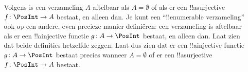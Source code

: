 \documentclass[openany]{memoir}
\begin{document}
\begin{prob}
  Volgens  is een verzameling $A$
  aftelbaar als $A = \emptyset$ of als er een !!a{surjective}
  $f\colon \PosInt \to A$ bestaat, en alleen dan. Je kunt een
  ``!!{enumerable} verzameling'' ook op een andere, even precieze manier definiëren: een
  verzameling is aftelbaar als er een !!a{injective} functie
  $g\colon A \to \PosInt$ bestaat, en alleen dan. Laat zien dat beide
  definities hetzelfde zeggen. Laat dus zien dat er een !!a{injective}
  functie $g\colon A \to \PosInt$ bestaat precies wanneer
  $A = \emptyset$ of er een !!a{surjective} $f\colon \PosInt \to A$
  bestaat.
\end{prob}
\endgroup

\begingroup
\def\olfilename{OLP-0030}
\def\olfilepath{content/sets-functions-relations/size-of-sets/}
\hypertarget{unit-OLP-0030}{}




\end{document}
